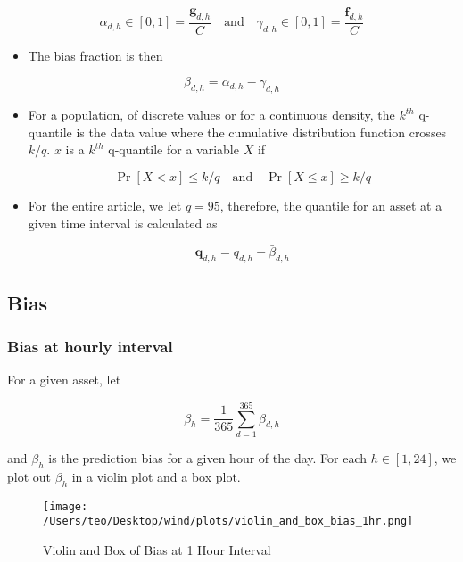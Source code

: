 \documentclass[
]{article}
\begin{document}
\[\alpha_{d,h}\in [0,1] = \frac{\mathbf{g}_{d,h}}{C} \quad \text{and} \quad \gamma_{d,h} \in [0,1] = \frac{\mathbf{f}_{d,h}}{C}\]

\begin{itemize}
\item
  The bias fraction is then
\end{itemize}

\[\beta_{d,h} =  \alpha_{d,h} - \gamma_{d,h}\]

\begin{itemize}
\item
  For a population, of discrete values or for a continuous density, the
  \(k^{th}\) q-quantile is the data value where the cumulative
  distribution function crosses \(k/q\). \(x\) is a \(k^{th}\)
  q-quantile for a variable \(X\) if

  \[\operatorname{Pr}[X<x] \leq k / q \quad \text{and} \quad\operatorname{Pr}[X \leq x] \geq k / q\]
\end{itemize}

\begin{itemize}
\item
  For the entire article, we let \(q =95\), therefore, the quantile for
  an asset at a given time interval is calculated as

  \[\mathbf{q}_{d,h} = q_{d,h} - \bar{\beta}_{d,h}\]
\end{itemize}

\hypertarget{bias}{%
\subsection{Bias}\label{bias}}

\hypertarget{bias-at-hourly-interval}{%
\subsubsection{Bias at hourly interval}\label{bias-at-hourly-interval}}

For a given asset, let

\[\beta_{h} = \frac{1}{365}\sum_{d = 1}^{365} \beta_{d,h}\]

and \(\beta_h\) is the prediction bias for a given hour of the day. For
each \(h \in [1,24]\), we plot out \(\beta_h\) in a violin plot and a
box plot.

\begin{figure}
\centering
\texttt{[image: /Users/teo/Desktop/wind/plots/violin\_and\_box\_bias\_1hr.png]}
\caption{Violin and Box of Bias at 1 Hour Interval}
\end{figure}
\end{document}
